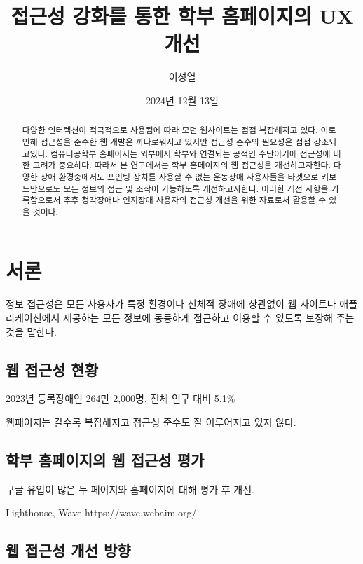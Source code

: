 \documentclass[ko]{snu-cse-bsc-thesis}
\title{접근성 강화를 통한 학부 홈페이지의 UX 개선}
\author{이성열}
\date{2024년 12월 13일}
\begin{document}
\maketitle

\begin{abstract}
다양한 인터렉션이 적극적으로 사용됨에 따라 모던 웹사이트는 점점 복잡해지고 있다. 이로인해 접근성을 준수한 웹 개발은 까다로워지고 있지만 접근성 준수의 필요성은 점점 강조되고있다. 컴퓨터공학부 홈페이지는 외부에서 학부와 연결되는 공적인 수단이기에 접근성에 대한 고려가 중요하다. 따라서 본 연구에서는 학부 홈페이지의 웹 접근성을 개선하고자한다. 다양한 장애 환경중에서도 포인팅 장치를 사용할 수 없는 운동장애 사용자들을 타겟으로 키보드만으로도 모든 정보의 접근 및 조작이 가능하도록 개선하고자한다. 이러한 개선 사항을 기록함으로서 추후 청각장애나 인지장애 사용자의 접근성 개선을 위한 자료로서 활용할 수 있을 것이다. 
\end{abstract}

\tableofcontents
\listoffigures

\chapter{서론}

정보 접근성은 모든 사용자가 특정 환경이나 신체적 장애에 상관없이 웹 사이트나 애플리케이션에서 제공하는
모든 정보에 동등하게 접근하고 이용할 수 있도록 보장해 주는 것을 말한다.

\section{웹 접근성 현황}

2023년 등록장애인 264만 2,000명, 전체 인구 대비 5.1\% 


웹페이지는 갈수록 복잡해지고 접근성 준수도 잘 이루어지고 있지 않다. 


\section{학부 홈페이지의 웹 접근성 평가}

구글 유입이 많은 두 페이지와 홈페이지에 대해 평가 후 개선.

Lighthouse, Wave https://wave.webaim.org/. 

\section{웹 접근성 개선 방향}
\end{document}
